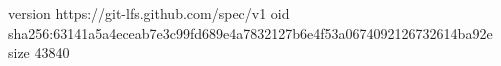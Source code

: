 version https://git-lfs.github.com/spec/v1
oid sha256:63141a5a4eceab7e3c99fd689e4a7832127b6e4f53a0674092126732614ba92e
size 43840
